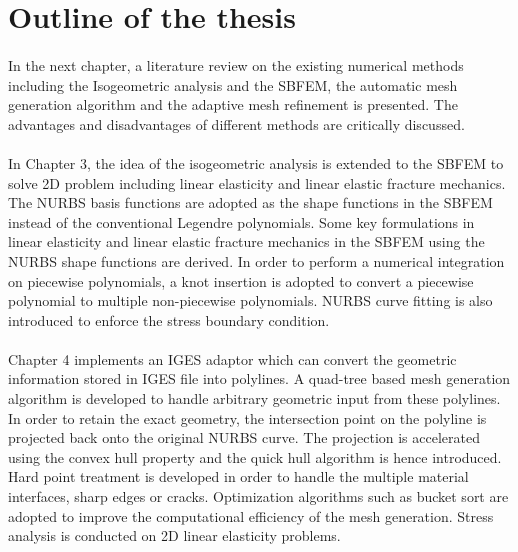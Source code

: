 \section{Outline of the thesis}
\paragraph{}
In the next chapter, a literature review on the existing numerical methods including the Isogeometric analysis and the SBFEM, the automatic mesh generation algorithm and the adaptive mesh refinement is presented.
The advantages and disadvantages of different methods are critically discussed.

\paragraph{}
In Chapter 3, the idea of the isogeometric analysis is extended to the SBFEM to solve 2D problem including linear elasticity and linear elastic fracture mechanics.
The NURBS basis functions are adopted as the shape functions in the SBFEM instead of the conventional Legendre polynomials.
Some key formulations in linear elasticity and linear elastic fracture mechanics in the SBFEM using the NURBS shape functions are derived.
In order to perform a numerical integration on piecewise polynomials, a knot insertion is adopted to convert a piecewise polynomial to multiple non-piecewise polynomials.
NURBS curve fitting is also introduced to enforce the stress boundary condition.

\paragraph{}
Chapter 4 implements an IGES adaptor which can convert the geometric information stored in IGES file into polylines.
A quad-tree based mesh generation algorithm is developed to handle arbitrary geometric input from these polylines.
In order to retain the exact geometry, the intersection point on the polyline is projected back onto the original NURBS curve.
The projection is accelerated using the convex hull property and the quick hull algorithm is hence introduced.
Hard point treatment is developed in order to handle the multiple material interfaces, sharp edges or cracks.
Optimization algorithms such as bucket sort are adopted to improve the computational efficiency of the mesh generation.
Stress analysis is conducted on 2D linear elasticity problems.

